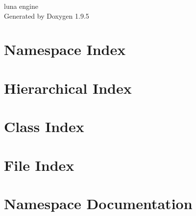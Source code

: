 \documentclass[twoside]{book}
\newcommand{\+}{\discretionary{\mbox{\scriptsize$\hookleftarrow$}}{}{}}
\newcommand{\clearemptydoublepage}{%
    \newpage{\pagestyle{empty}\cleardoublepage}%
  }
\begin{document}
  \raggedbottom
    \hypersetup{pageanchor=false,
                bookmarksnumbered=true,
                pdfencoding=unicode
               }
  \begin{titlepage}
  \vspace*{7cm}
  \begin{center}%
  {\Large luna engine}\\
  \vspace*{1cm}
  {\large Generated by Doxygen 1.9.5}\\
  \end{center}
  \end{titlepage}
  \clearemptydoublepage
  \tableofcontents
  \clearemptydoublepage
  \hypersetup{pageanchor=true}
\chapter{Namespace Index}

\chapter{Hierarchical Index}

\chapter{Class Index}

\chapter{File Index}

\chapter{Namespace Documentation}






\end{document}
